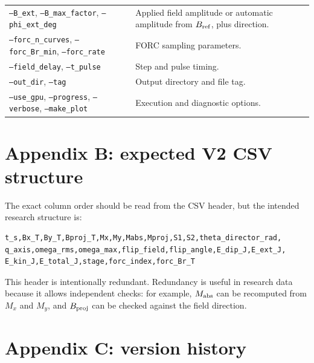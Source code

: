 \documentclass[11pt,a4paper]{article}
\newcommand{\code}[1]{\texttt{#1}}
\begin{document}
\begin{longtable}{@{}p{4.4cm}p{10.4cm}@{}}
\code{--B\_ext}, \code{--B\_max\_factor}, \code{--phi\_ext\_deg} & Applied field amplitude or automatic amplitude from $B_{\rm ref}$, plus direction.\\
\code{--forc\_n\_curves}, \code{--forc\_Br\_min}, \code{--forc\_rate} & FORC sampling parameters.\\
\code{--field\_delay}, \code{--t\_pulse} & Step and pulse timing.\\
\code{--out\_dir}, \code{--tag} & Output directory and file tag.\\
\code{--use\_gpu}, \code{--progress}, \code{--verbose}, \code{--make\_plot} & Execution and diagnostic options.\\
\end{longtable}

\section{Appendix B: expected V2 CSV structure}
\label{app:csv}

The exact column order should be read from the CSV header, but the intended research structure is:

\begin{lstlisting}[style=csvstyle]
t_s,Bx_T,By_T,Bproj_T,Mx,My,Mabs,Mproj,S1,S2,theta_director_rad,
q_axis,omega_rms,omega_max,flip_field,flip_angle,E_dip_J,E_ext_J,
E_kin_J,E_total_J,stage,forc_index,forc_Br_T
\end{lstlisting}

This header is intentionally redundant. Redundancy is useful in research data because it allows independent checks: for example, $M_{\rm abs}$ can be recomputed from $M_x$ and $M_y$, and $B_{\rm proj}$ can be checked against the field direction.

\section{Appendix C: version history}
\label{app:versions}
\end{document}
